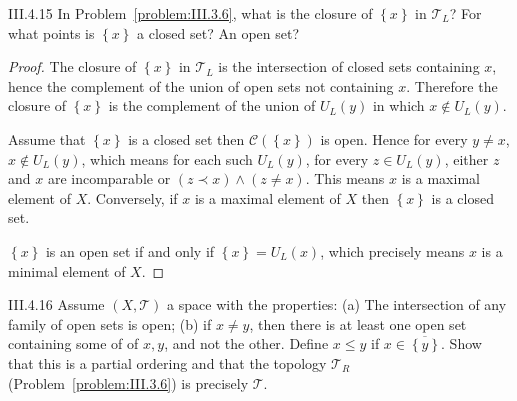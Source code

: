 \begin{problem}{III.4.15}
In Problem~\ref{problem:III.3.6}, what is the closure of \( \left\{ x \right\} \) in \( \mathscr{T}_{L} \)? For what points is \( \left\{ x \right\} \) a closed set? An open set?
\end{problem}

\begin{proof}
    The closure of \( \left\{ x \right\} \) in \( \mathscr{T}_{L} \) is the intersection of closed sets containing \( x \), hence the complement of the union of open sets not containing \(x\). Therefore the closure of \( \left\{ x \right\} \) is the complement of the union of \( U_{L}(y) \) in which \( x \notin U_{L}(y) \).

    Assume that \( \left\{ x \right\} \) is a closed set then \( \mathscr{C}(\left\{ x \right\}) \) is open. Hence for every \( y \ne x \), \( x \notin U_{L}(y) \), which means for each such \( U_{L}(y) \), for every \( z \in U_{L}(y) \), either \( z \) and \( x \) are incomparable or \( (z \prec x) \land (z \ne x) \). This means \( x \) is a maximal element of \( X \). Conversely, if \( x \) is a maximal element of \( X \) then \( \left\{ x \right\} \) is a closed set.

    \( \left\{ x \right\} \) is an open set if and only if \( \left\{ x \right\} = U_{L}(x) \), which precisely means \( x \) is a minimal element of \( X \).
\end{proof}

\begin{problem}{III.4.16}
Assume \( (X, \mathscr{T}) \) a space with the properties: (a) The intersection of any family of open sets is open; (b) if \(x\ne y\), then there is at least one open set containing some of of \(x, y\), and not the other. Define \( x\le y \) if \( x \in \overline{\left\{y\right\}} \). Show that this is a partial ordering and that the topology \( \mathscr{T}_{R} \) (Problem~\ref{problem:III.3.6}) is precisely \( \mathscr{T} \).
\end{problem}

